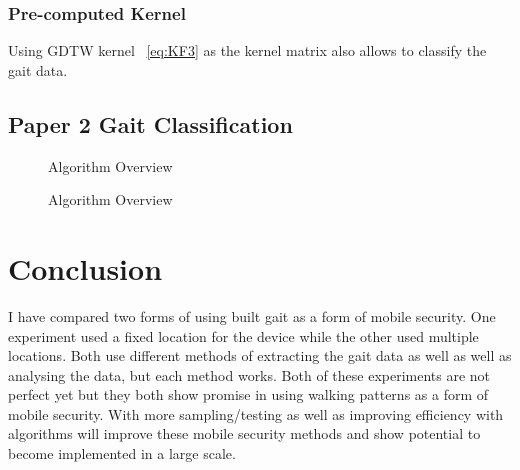 \documentclass{sig-alternate}
\begin{document}
\subsubsection{Pre-computed Kernel}
Using GDTW kernel ~\ref{eq:KF3} as the kernel matrix also allows to classify the gait data.


\subsection{Paper 2 Gait Classification}

\begin{figure}
\centering
{}
\caption{Algorithm Overview}
\label{fig:Paper1Summary}
\end{figure}

\begin{figure*}
\centering
{}
\caption{Algorithm Overview}
\label{fig:Paper2Summary}
\end{figure*}
\section{Conclusion}
I have compared two forms of using built gait as a form of mobile security. One experiment used a fixed location for the device while the other used multiple locations. Both use different methods of extracting the gait data as well as well as analysing the data, but each method works. Both of these experiments are not perfect yet but they both show promise in using walking patterns as a form of mobile security. With more sampling/testing as well as improving efficiency with algorithms will improve these mobile security methods and show potential to become implemented in a large scale. 
\end{document}
